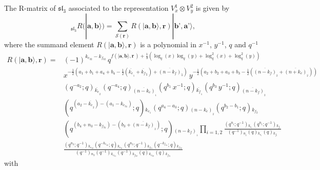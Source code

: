 \documentclass[12pt,oneside,reqno]{amsart}
\numberwithin{teorema}{section}
\numberwithin{definicion}{section}
\numberwithin{lema}{section}
\numberwithin{conjetura}{section}
\numberwithin{proposicion}{section}
\def\sl{\mathfrak{sl}}
\begin{document}
The R-matrix of $\sl_3$ associated to the representation $V_x^{1}\otimes V_y^{2}$ is given by
\begin{equation}\label{eq:R-matrix-general}
    {}_{\sl_3}R(|\textbf{a},\textbf{b}\rangle) = \sum_{\mathcal{S}(\textbf{r})} R\left(|\textbf{a},\textbf{b}\rangle,\textbf{r}\right)|\textbf{b'},\textbf{a'}\rangle,
\end{equation}
where the summand element $R\left(|\textbf{a},\textbf{b}\rangle,\textbf{r}\right)$ is a polynomial in $x^{-1}$, $y^{-1}$, $q$ and $q^{-1}$
\begin{equation}\label{eq:R-matrix}
    \begin{split}
    R\left(|\textbf{a},\textbf{b}\rangle,\textbf{r}\right) = 
    &(-1)^{k_{e_{32}}-k_{f_{32}}} \,q^{f\left(|\textbf{a},\textbf{b}\rangle,\textbf{r}\,\right) + \frac{1}{3} \left(\log_q (x) \log_q (y)+\log_q ^2(x)+\log_q ^2(y)\right)} 
    \\& x^{-\frac{1}{2}(a_1+b_1+a_4+b_4-\frac{1}{2}(\overline{k_e}_{{}_1}+\overline{k_f}_{1})+\overline{(n-k_f)}_{1})} \, y^{-\frac{1}{2}(a_2+b_2+a_3+b_3-\frac{1}{2}(\overline{(n-k_f)}_{{}_2}+\overline{(n+k_e)}_{{}_2}))}
    \\& \left(q^{-a_2};q\right){}_{\overline{k_e}_{{}_2}} \left(q^{- a_4};q\right){}_{\overline{\left(n-k_{e}\right)}_{{}_1}} \left(q^{ b_1}\,x^{-1};q\right){}_{\overline{k_f}_{{}_1}} \left(q^{b_3}\,y^{-1};q\right){}_{\overline{(n-k_{f})}_{{}_2}}  
    \\& \left(q^{(a_2-\overline{k_e}_{{}_2})-(a_1-k_{e_{31}})};q\right){}_{k_{e_1}} \left(q^{a_4-a_3};q\right){}_{(n-k_e)_{{}_2}} \left(q^{b_2-b_1};q\right){}_{k_{f_2}} 
    \\& \left(q^{(b_4+n_3-k_{f_{31}})-(b_3+\overline{(n-k_{f})}_{{}_2})};q\right){}_{(n-k_f)_{{}_1}}
    \prod_{i=1,2} \frac{\left(q^{n_i};q^{-1}\right){}_{k_{e_i}}\left(q^{n_i};q^{-1}\right){}_{k_{f_i}}}{\left(q^{-1}\right){}_{n_i}\left(q\right){}_{k_{e_i}}\left(q\right){}_{k_{f_i}}} 
    \\&\frac{\left(q^{n_3};q^{-1}\right){}_{k_{e_{32}}}\left(q^{-k_{e_{32}}};q\right){}_{k_{e_{31}}}\left(q^{n_3};q^{-1}\right){}_{k_{f_{31}}}\left(q^{-k_{f_{31}}};q\right){}_{k_{f_{32}}}}{\left(q^{-1}\right){}_{n_3}\left(q^{-1}\right){}_{k_{e_{31}}}\left(q^{-1}\right){}_{k_{f_{32}}}\left(q\right){}_{k_{e_{32}}}\left(q\right){}_{k_{f_{31}}}}
    \end{split}
\end{equation}
with
\end{document}
